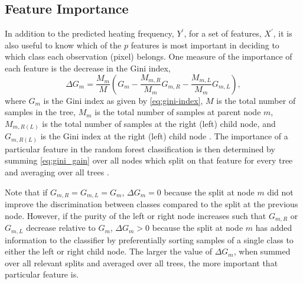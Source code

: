 \subsection{Feature Importance}\label{sec:feature-importance}

In addition to the predicted heating frequency, $Y^\prime$, for a set of features, $X^\prime$, it is also useful to know which of the $p$ features is most important in deciding to which class each observation (pixel) belongs.
One measure of the importance of each feature is the decrease in the Gini index,
\begin{equation}\label{eq:gini_gain}
    \Delta G_m = \frac{M_m}{M}\left( G_m - \frac{M_{m,R}}{M_m}G_{m,R} - \frac{M_{m,L}}{M_m}G_{m,L} \right),
\end{equation}
where $G_m$ is the Gini index as given by \autoref{eq:gini-index}, $M$ is the total number of samples in the tree, $M_m$ is the total number of samples at parent node $m$, $M_{m,R(L)}$ is the total number of samples at the right (left) child node, and $G_{m,R(L)}$ is the Gini index at the right (left) child node \citep{sandri_bias_2008}.
The importance of a particular feature in the random forest classification is then determined by summing \autoref{eq:gini_gain} over all nodes which split on that feature for every tree and averaging over all trees \citep{breiman_classification_1984}.

Note that if $G_{m,R}=G_{m,L}=G_m$, $\Delta G_m=0$ because the split at node $m$ did not improve the discrimination between classes compared to the split at the previous node.
However, if the purity of the left or right node increases such that $G_{m,R}$ or $G_{m,L}$ decrease relative to $G_m$, $\Delta G_m > 0$ because the split at node $m$ has added information to the classifier by preferentially sorting samples of a single class to either the left or right child node.
The larger the value of $\Delta G_m$, when summed over all relevant splits and averaged over all trees, the more important that particular feature is.


